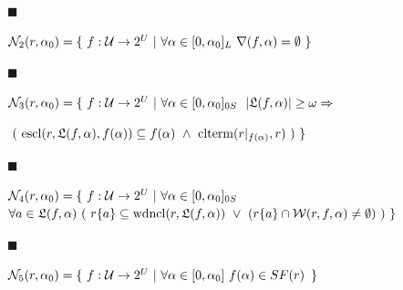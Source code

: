  
 
\par\noindent  $\blacksquare$ 
 
$\mathcal{N}_{2}(r,\alpha_{0})=\{\leavevmode\nobreak\ f:\mathcal{U}\to 2^{U}%
\leavevmode\nobreak\ |\leavevmode\nobreak\ \forall\alpha\in[0,\alpha_{0}]_{L}%
\leavevmode\nobreak\ \nabla(f,\alpha)=\emptyset\leavevmode\nobreak\ \}$\par
 
 
 
\par\noindent  $\blacksquare$ 
 
$\mathcal{N}_{3}(r,\alpha_{0})=\{\leavevmode\nobreak\ f:\mathcal{U}\to 2^{U}%
\leavevmode\nobreak\ |\leavevmode\nobreak\ \forall\alpha\in[0,\alpha_{0}]_{0S}%
\leavevmode\nobreak\ \leavevmode\nobreak\ |\mathfrak{L}(f,\alpha)|\geq\omega\Rightarrow$\par
 
 
 
$\leavevmode\nobreak\ (\leavevmode\nobreak\ \mathrm{escl}(r,\mathfrak{L}(f,%
\alpha),f(\alpha))\subseteq f(\alpha)\leavevmode\nobreak\ \wedge\leavevmode%
\nobreak\ \mathrm{clterm}(r|_{f(\alpha)},r)\leavevmode\nobreak\ )\leavevmode%
\nobreak\ \}$\par
 
 
 
\par\noindent  $\blacksquare$ 
 
$\mathcal{N}_{4}(r,\alpha_{0})=\{\leavevmode\nobreak\ f:\mathcal{U}\to 2^{U}%
\leavevmode\nobreak\ |\leavevmode\nobreak\ \forall\alpha\in[0,\alpha_{0}]_{0S}%
\leavevmode\nobreak\ $  $\forall a\in\mathfrak{L}(f,\alpha)\leavevmode\nobreak\ (\leavevmode\nobreak\ r%
\{a\}\subseteq\mathrm{wdncl}(r,\mathfrak{L}(f,\alpha))\leavevmode\nobreak\ %
\vee\leavevmode\nobreak\ (r\{a\}\cap\mathcal{W}(r,f,\alpha)\neq\emptyset)%
\leavevmode\nobreak\ )\leavevmode\nobreak\ \}$\par
 
 
 
\par\noindent  $\blacksquare$ 
 
$\mathcal{N}_{5}(r,\alpha_{0})=\{\leavevmode\nobreak\ f:\mathcal{U}\to 2^{U}%
\leavevmode\nobreak\ |\leavevmode\nobreak\ \forall\alpha\in[0,\alpha_{0}]%
\leavevmode\nobreak\ f(\alpha)\in SF(r)\,\leavevmode\nobreak\ \}$\par
 
